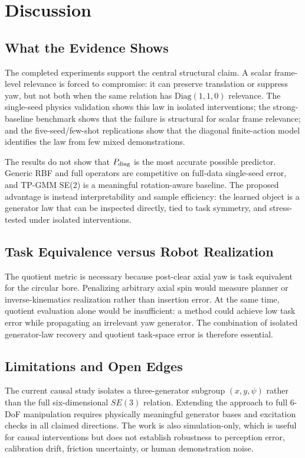 \documentclass[letterpaper,10pt,conference]{ieeeconf}
\begin{document}
\section{Discussion}
\label{sec:discussion}

\subsection{What the Evidence Shows}

The completed experiments support the central structural claim. A scalar
frame-level relevance is forced to compromise: it can preserve translation or
suppress yaw, but not both when the same relation has
$\mathrm{Diag}(1,1,0)$ relevance. The single-seed physics validation shows this
law in isolated interventions; the strong-baseline benchmark shows that the
failure is structural for scalar frame relevance; and the five-seed/few-shot
replications show that the diagonal finite-action model identifies the law from
few mixed demonstrations.

The results do not show that $P_{\rm diag}$ is the most accurate possible
predictor. Generic RBF and full operators are competitive on full-data
single-seed error, and TP-GMM SE(2) is a meaningful rotation-aware baseline.
The proposed advantage is instead interpretability and sample efficiency: the
learned object is a generator law that can be inspected directly, tied to task
symmetry, and stress-tested under isolated interventions.

\subsection{Task Equivalence versus Robot Realization}

The quotient metric is necessary because post-clear axial yaw is task
equivalent for the circular bore. Penalizing arbitrary axial spin would measure
planner or inverse-kinematics realization rather than insertion error. At the
same time, quotient evaluation alone would be insufficient: a method could
achieve low task error while propagating an irrelevant yaw generator. The
combination of isolated generator-law recovery and quotient task-space error is
therefore essential.

\subsection{Limitations and Open Edges}

The current causal study isolates a three-generator subgroup $(x,y,\psi)$
rather than the full six-dimensional $SE(3)$ relation. Extending the approach
to full 6-DoF manipulation requires physically meaningful generator bases and
excitation checks in all claimed directions. The work is also simulation-only,
which is useful for causal interventions but does not establish robustness to
perception error, calibration drift, friction uncertainty, or human
demonstration noise.
\end{document}
